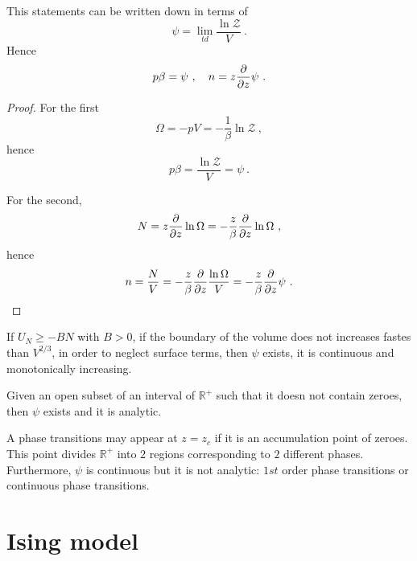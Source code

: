     This statements can be written down in terms of 
    \begin{equation*}
        \psi = \lim_{td} \frac{\ln \mathcal Z}{V} ~.
    \end{equation*}
    Hence 
    \begin{equation*}
        p \beta = \psi ~, \quad n = z \frac{\partial}{\partial z} \psi ~.
    \end{equation*}
    \begin{proof}
        For the first 
        \begin{equation*}
            \Omega = - p V = - \frac{1}{\beta} \ln \mathcal Z ~,
        \end{equation*}
        hence
        \begin{equation*}
            p \beta = \frac{\ln \mathcal Z}{V} = \psi ~.
        \end{equation*}

        For the second,
        \begin{equation*}
            N = z \frac{\partial}{\partial z} \ln \Omega = - \frac{z}{\beta} \frac{\partial}{\partial z} \ln \Omega ~,
        \end{equation*}
        hence
        \begin{equation*}
            n = \frac{N}{V} = - \frac{z}{\beta} \frac{\partial}{\partial z} \frac{\ln \Omega}{V} =  - \frac{z}{\beta} \frac{\partial}{\partial z} \psi ~.
        \end{equation*}
    \end{proof}

    \begin{theorem}
        If $U_N \geq - BN$ with $B > 0$, if the boundary of the volume does not increases fastes than $V^{2/3}$, in order to neglect surface terms, then $\psi$ exists, it is continuous and monotonically increasing.
    \end{theorem}
    \begin{theorem}
        Given an open subset of an interval of $\mathbb R^+$ such that it doesn not contain zeroes, then $\psi$ exists and it is analytic.
    \end{theorem}
    \begin{corollary}
        A phase transitions may appear at $z = z_c$ if it is an accumulation point of zeroes. This point divides $\mathbb R^+$ into $2$ regions corresponding to $2$ different phases. Furthermore, $\psi$ is continuous but it is not analytic: $1st$ order phase transitions or continuous phase transitions.
    \end{corollary}

\chapter{Ising model}